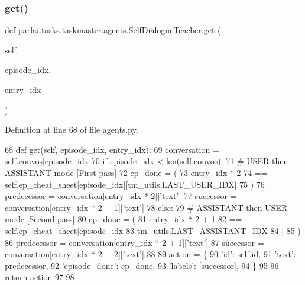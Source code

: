 \subsubsection{\texorpdfstring{get()}{get()}}
{\footnotesize\ttfamily def parlai.\+tasks.\+taskmaster.\+agents.\+Self\+Dialogue\+Teacher.\+get (\begin{DoxyParamCaption}\item[{}]{self,  }\item[{}]{episode\+\_\+idx,  }\item[{}]{entry\+\_\+idx }\end{DoxyParamCaption})}



Definition at line 68 of file agents.\+py.


\begin{DoxyCode}
68     \textcolor{keyword}{def }get(self, episode\_idx, entry\_idx):
69         conversation = self.convos[episode\_idx %
70         \textcolor{keywordflow}{if} episode\_idx < len(self.convos):
71             \textcolor{comment}{# USER then ASSISTANT mode [First pass]}
72             ep\_done = (
73                 entry\_idx * 2
74                 == self.ep\_cheat\_sheet[episode\_idx][tm\_utils.LAST\_USER\_IDX]
75             )
76             predecessor = conversation[entry\_idx * 2][\textcolor{stringliteral}{'text'}]
77             successor = conversation[entry\_idx * 2 + 1][\textcolor{stringliteral}{'text'}]
78         \textcolor{keywordflow}{else}:
79             \textcolor{comment}{# ASSISTANT then USER mode [Second pass]}
80             ep\_done = (
81                 entry\_idx * 2 + 1
82                 == self.ep\_cheat\_sheet[episode\_idx %
83                     tm\_utils.LAST\_ASSISTANT\_IDX
84                 ]
85             )
86             predecessor = conversation[entry\_idx * 2 + 1][\textcolor{stringliteral}{'text'}]
87             successor = conversation[entry\_idx * 2 + 2][\textcolor{stringliteral}{'text'}]
88 
89         action = \{
90             \textcolor{stringliteral}{'id'}: self.id,
91             \textcolor{stringliteral}{'text'}: predecessor,
92             \textcolor{stringliteral}{'episode\_done'}: ep\_done,
93             \textcolor{stringliteral}{'labels'}: [successor],
94         \}
95 
96         \textcolor{keywordflow}{return} action
97 
98 
\end{DoxyCode}
\mbox{\label{classparlai_1_1tasks_1_1taskmaster_1_1agents_1_1SelfDialogueTeacher_a20da7abc53d7a872ec5346bf81b61593}} 
